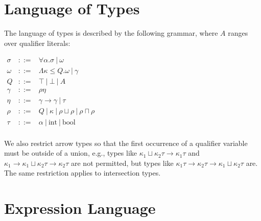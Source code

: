 \documentclass{article}
\begin{document}
\section{Language of Types}

The language of types is described by the following grammar, where $A$ ranges over qualifier literals:

\begin{math}
\begin{array}{rcl}
\sigma & ::= & \forall \alpha . \sigma\ |\ \omega \\

\omega & ::= & \Lambda \kappa \le Q . \omega\ |\ \gamma \\

Q & ::= & \top\ |\ \bot\ |\ A \\

\gamma & ::= & \rho \eta \\

\eta & ::= & \gamma \rightarrow \gamma\ |\ \tau \\

\rho & ::= & Q\ |\ \kappa\ |\ \rho \sqcup \rho\ |\ \rho \sqcap \rho \\

\tau & ::= & \alpha\ |\ \textrm{int}\ |\ \textrm{bool} \\

\end{array}
\end{math}

We also restrict arrow types so that the first occurrence of a qualifier variable must be outside of a union, e.g., types like ${\kappa}_1 \sqcup {\kappa}_2 \tau \rightarrow {\kappa}_1 \tau$ and ${\kappa}_1 \rightarrow {\kappa}_1 \sqcup {\kappa}_2 \tau \rightarrow {\kappa}_2 \tau$ are not permitted, but types like ${\kappa}_1 \tau \rightarrow {\kappa}_2 \tau \rightarrow {\kappa}_1 \sqcup {\kappa}_2 \tau$ are.
  The same restriction applies to intersection types.


\section{Expression Language}
\end{document}
